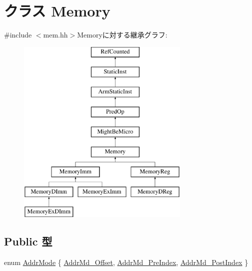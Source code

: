 \hypertarget{classArmISA_1_1Memory}{
\section{クラス Memory}
\label{classArmISA_1_1Memory}
}


{\ttfamily \#include $<$mem.hh$>$}Memoryに対する継承グラフ:\begin{figure}[H]
\begin{center}
\leavevmode
\includegraphics[height=9cm]{classArmISA_1_1Memory}
\end{center}
\end{figure}
\subsection*{Public 型}
\begin{DoxyCompactItemize}
\item 
enum \hyperlink{classArmISA_1_1Memory_abf132b4ad93f3557cd3956577592ba68}{AddrMode} \{ \hyperlink{classArmISA_1_1Memory_abf132b4ad93f3557cd3956577592ba68a65551ba1b10e5734f879f0333cdcb7da}{AddrMd\_\-Offset}, 
\hyperlink{classArmISA_1_1Memory_abf132b4ad93f3557cd3956577592ba68ae21d09df49cf2636f746abd6749e9a47}{AddrMd\_\-PreIndex}, 
\hyperlink{classArmISA_1_1Memory_abf132b4ad93f3557cd3956577592ba68af7adc379284699304b17af32b41e8ea1}{AddrMd\_\-PostIndex}
 \}
\end{DoxyCompactItemize}
